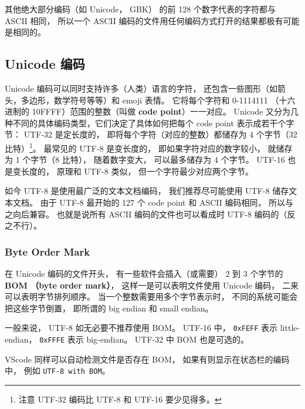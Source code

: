 其他绝大部分编码（如 Unicode， GBK） 的前 128 个数字代表的字符都与 ASCII 相同， 所以一个 ASCII 编码的文件用任何编码方式打开的结果都极有可能是相同的。

\subsection{Unicode 编码}
Unicode 编码可以同时支持许多（人类）语言的字符， 还包含一些图形（如箭头，多边形，数学符号等等）和 emoji 表情。 它将每个字符和 0-1114111 （十六进制的 10FFFF）范围的整数（叫做 \textbf{code point}）一一对应。 Unicode 又分为几种不同的具体编码类型，它们决定了具体如何把每个 code point 表示成若干个字节： UTF-32 是定长度的， 即将每个字符（对应的整数）都储存为 4 个字节（32 比特）\footnote{注意 UTF-32 编码比 UTF-8 和 UTF-16 要少见得多。}。 最常见的 UTF-8 是变长度的， 即如果字符对应的数字较小， 就储存为 1 个字节（8 比特）， 随着数字变大， 可以最多储存为 4 个字节。 UTF-16 也是变长度的， 原理和 UTF-8 类似， 但一个字符最少对应两个字节。

如今 UTF-8 是使用最广泛的文本文档编码， 我们推荐尽可能使用 UTF-8 储存文本文档。 由于 UTF-8 最开始的 127 个 code point 和 ASCII 编码相同， 所以与之向后兼容。 也就是说所有 ASCII 编码的文件也可以看成时 UTF-8 编码的（反之不行）。

\subsubsection{Byte Order Mark}
在 Unicode 编码的文件开头， 有一些软件会插入（或需要） 2 到 3 个字节的 \textbf{BOM （byte order mark）}， 这样一是可以表明文件使用 Unicode 编码， 二来可以表明字节排列顺序。 当一个整数需要用多个字节表示时， 不同的系统可能会把这些字节倒置， 即所谓的 big endian 和 small endian。

一般来说， UTF-8 如无必要不推荐使用 BOM。 UTF-16 中， \verb|0xFEFF| 表示 little-endian， \verb|0xFFFE| 表示 big-endian。 UTF-32 中 BOM 也是可选的。

VScode 同样可以自动检测文件是否存在 BOM， 如果有则显示在状态栏的编码中， 例如 \verb|UTF-8 with BOM|。
